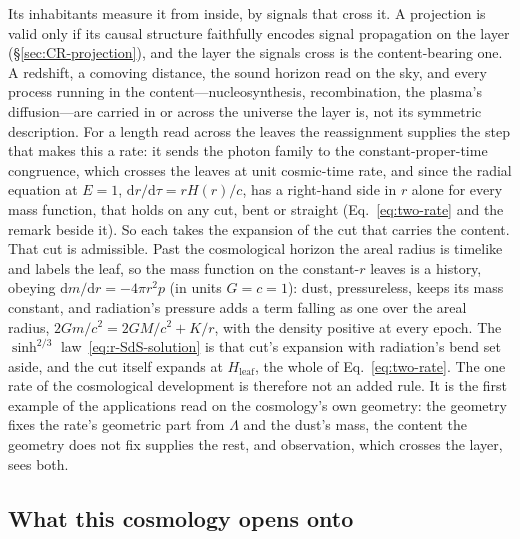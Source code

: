 \documentclass[11pt,a4paper]{article}
\theoremstyle{plain}
\theoremstyle{definition}
\theoremstyle{remark}
\newcommand{\dd}{\mathrm{d}}
\begin{document}
Its inhabitants measure it from inside, by signals that cross it. A projection is valid only if its causal structure faithfully encodes signal propagation on the layer (\S\ref{sec:CR-projection}), and the layer the signals cross is the content-bearing one. A redshift, a comoving distance, the sound horizon read on the sky, and every process running in the content---nucleosynthesis, recombination, the plasma's diffusion---are carried in or across the universe the layer is, not its symmetric description. For a length read across the leaves the reassignment supplies the step that makes this a rate: it sends the photon family to the constant-proper-time congruence, which crosses the leaves at unit cosmic-time rate, and since the radial equation at $E=1$, $\dd r/\dd\tau=rH(r)/c$, has a right-hand side in $r$ alone for every mass function, that holds on any cut, bent or straight (Eq.~\eqref{eq:two-rate} and the remark beside it). So each takes the expansion of the cut that carries the content. That cut is admissible. Past the cosmological horizon the areal radius is timelike and labels the leaf, so the mass function on the constant-$r$ leaves is a history, obeying $\dd m/\dd r=-4\pi r^{2}p$ (in units $G=c=1$): dust, pressureless, keeps its mass constant, and radiation's pressure adds a term falling as one over the areal radius, $2Gm/c^{2}=2GM/c^{2}+K/r$, with the density positive at every epoch. The $\sinh^{2/3}$ law~\eqref{eq:r-SdS-solution} is that cut's expansion with radiation's bend set aside, and the cut itself expands at $H_{\text{leaf}}$, the whole of Eq.~\eqref{eq:two-rate}. The one rate of the cosmological development is therefore not an added rule. It is the first example of the applications read on the cosmology's own geometry: the geometry fixes the rate's geometric part from $\Lambda$ and the dust's mass, the content the geometry does not fix supplies the rest, and observation, which crosses the layer, sees both.

\subsection{What this cosmology opens onto}
\end{document}
